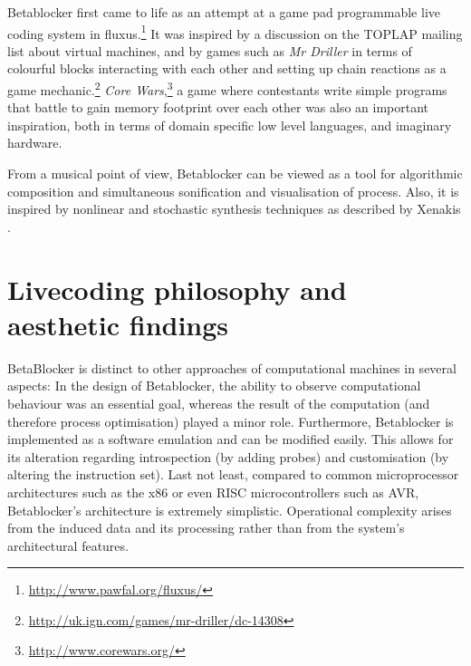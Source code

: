 \documentclass[letterpaper, 12pt]{article}
\begin{document}

Betablocker first came to life as an attempt at a game pad programmable live coding system in fluxus.\footnote{
\url{http://www.pawfal.org/fluxus/}
} 
It was inspired by a discussion on the TOPLAP mailing list about virtual machines, and by games such as \emph{Mr Driller} in terms of colourful blocks interacting with each other and setting up chain reactions as a game mechanic.\footnote{
\url{http://uk.ign.com/games/mr-driller/dc-14308}
}
\emph{Core Wars},\footnote{
\url{http://www.corewars.org/}
} a game where contestants write simple programs that battle to gain memory footprint over each other was also an important inspiration, both in terms of domain specific low level languages, and imaginary hardware.

From a musical point of view, Betablocker can be viewed as a tool for algorithmic composition \citep*{maurer1999-a-b} and simultaneous sonification and visualisation of process.
Also, it is inspired by nonlinear and stochastic synthesis techniques as described by Xenakis \citep*{Xenakis:1971, luque2009-the}.



\parskip 18pt

\section{Livecoding philosophy and aesthetic findings}
\label{sec:distinct_character}



BetaBlocker is distinct to other approaches of computational machines in several aspects:
In the design of Betablocker, the ability to observe computational behaviour was an essential goal, whereas the result of the computation (and therefore process optimisation) played a minor role.  
Furthermore, Betablocker is implemented as a software emulation and can be modified easily.
This allows for its alteration regarding introspection (by adding probes) and customisation (by altering the instruction set).
Last not least, compared to common microprocessor architectures such as the x86 \citep{alpert1993-arc}
or even RISC
microcontrollers \citep{kane1988-mip} such as AVR, Betablocker's architecture is extremely simplistic.
Operational complexity arises from the induced data and its processing rather than from the system's architectural features.
\end{document}
